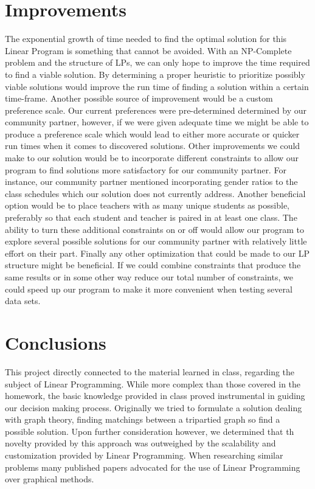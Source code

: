 \documentclass[11pt]{article}
\begin{document}
\section{Improvements}
The exponential growth of time needed to find the optimal solution for this Linear Program is something that cannot be avoided. With an NP-Complete problem and the structure of LPs, we can only hope to improve the time required to find a viable solution. By determining a proper heuristic to prioritize possibly viable solutions would improve the run time of finding a solution within a certain time-frame. Another possible source of improvement would be a custom preference scale. Our current preferences were pre-determined determined by our community partner, however, if we were given adequate time we might be able to produce a preference scale which would lead to either more accurate or quicker run times when it comes to discovered solutions. 
\indent Other improvements we could make to our solution would be to incorporate different constraints to allow our program to find solutions more satisfactory for our community partner. For instance, our community partner mentioned incorporating gender ratios to the class schedules which our solution does not currently address.
\indent Another beneficial option would be to place teachers with as many unique students as possible, preferably so that each student and teacher is paired in at least one class. The ability to turn these additional constraints on or off would allow our program to explore several possible solutions for our community partner with relatively little effort on their part.
\indent Finally any other optimization that could be made to our LP structure might be beneficial. If we could combine constraints that produce the same results or in some other way reduce our total number of constraints, we could speed up our program to make it more convenient when testing several data sets.

\section{Conclusions}
This project directly connected to the material learned in class, regarding the subject of Linear Programming. While more complex than those covered in the homework, the basic knowledge provided in class proved instrumental in guiding our decision making process. Originally we tried to formulate a solution dealing with graph theory, finding matchings between a tripartied graph so find a possible solution. Upon further consideration however, we determined that th novelty provided by this approach was outweighed by the scalability and customization provided by Linear Programming. When researching similar problems many published papers advocated for the use of Linear Programming over graphical methods.
\end{document}
